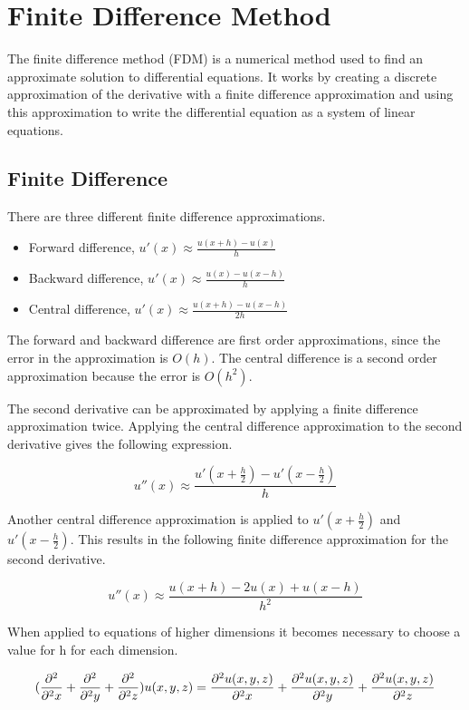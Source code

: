 \section{Finite Difference Method}

The finite difference method (FDM) is a numerical method used to find an approximate 
solution to differential equations. It works by creating a discrete approximation 
of the derivative with a finite difference approximation and using this approximation
to write the differential equation as a system of linear equations.

\subsection{Finite Difference}

There are three different finite difference approximations.

\begin{itemize}
	\item Forward difference, $u'(x) \approx \frac{u(x+h) - u(x)}{h}$
	\item Backward difference, $u'(x) \approx \frac{u(x) - u(x - h)}{h}$
	\item Central difference, $u'(x) \approx \frac{u(x + h) - u(x - h)}{2h}$
\end{itemize}

The forward and backward difference are first order approximations, since the
error in the approximation is $O(h)$. The central difference is a second order
approximation because the error is $O(h^2)$.

The second derivative can be approximated by applying a finite difference
approximation twice. Applying the central difference approximation to the second
derivative gives the following expression.

$$ u''(x) \approx \frac{u'(x + \frac{h}{2}) - u'(x - \frac{h}{2})}{h} $$

Another central difference approximation is applied to $u'(x + \frac{h}{2})$ and
$u'(x - \frac{h}{2})$. This results in the following finite difference
approximation for the second derivative.

$$u''(x) \approx \frac{u(x+h) - 2u(x) + u(x-h)}{h^2}$$

When applied to equations of higher dimensions it becomes necessary to choose a
value for h for each dimension.

$$(\frac{\partial^2}{\partial^2 x} + \frac{\partial^2}{\partial^2 y} + \frac{\partial^2}{\partial^2 z}) u(x, y, z) = \frac{\partial^2 u(x, y, z)}{\partial^2 x} 
+ \frac{\partial^2 u(x, y, z)}{\partial^2 y} + \frac{\partial^2 u(x, y, z)}{\partial^2 z}$$

